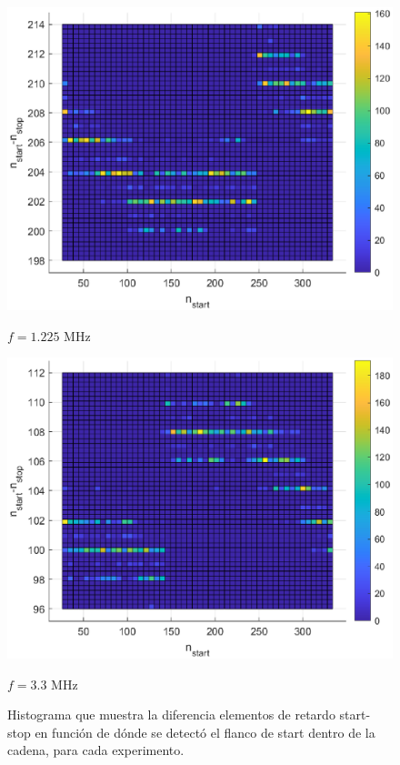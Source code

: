 \begin{figure}[H]
     \vspace{0.5cm} %
     
     \begin{minipage}{0.45\textwidth}
         \centering
         \includegraphics[width=\textwidth]{imagenes/start-stop_1225M.eps} %
         \caption{$f = 1.225$ MHz}
     \end{minipage}\hfill
     \begin{minipage}{0.45\textwidth}
         \centering
         \includegraphics[width=\textwidth]{imagenes/start-stop_3M3.eps} %
         \caption{$f = 3.3$ MHz}
     \end{minipage}
     \caption{Histograma que muestra la diferencia elementos de retardo start-stop en función
          de dónde se detectó el flanco de start dentro de la cadena, para cada experimento.}
\end{figure}

